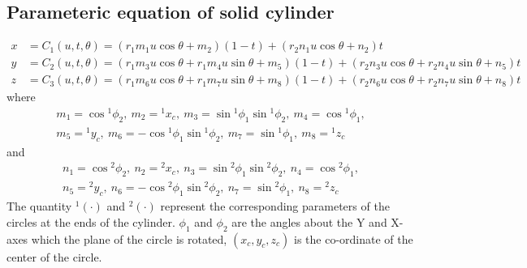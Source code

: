 \documentclass[11pt,a4paper]{article}
\begin{document}
\subsection*{Parameteric equation of solid cylinder}
\begin{align}
x & = C_1(u,t,\theta)=\left(r_1m_1u\cos\theta +m_2 \right)\left(1-t \right)+\left(r_2n_1u\cos\theta+n_2 \right)t\\
y & = C_2(u,t,\theta)=\left(r_1m_3u\cos\theta +r_1m_4u\sin\theta +m_5 \right)\left(1-t \right)+\left(r_2n_3u\cos\theta+r_2n_4u\sin\theta+n_5 \right)t\\
z & = C_3(u,t,\theta)=\left(r_1m_6u\cos\theta +r_1m_7u\sin\theta +m_8 \right)\left(1-t \right)+\left(r_2n_6u\cos\theta+r_2n_7u\sin\theta+n_8 \right)t
\end{align}
where
\begin{align}
m_1 = \cos{}^1\phi_2,~m_2 = {}^1x_c,~m_3 = \sin{}^1\phi_1\sin{}^1\phi_2,~m_4=\cos{}^1\phi_1,\\
m_5 = {}^1y_c,~m_6=-\cos{}^1\phi_1\sin{}^1\phi_2,~m_7=\sin{}^1\phi_1,~m_8={}^1z_c
\end{align}
and
\begin{align}
n_1 = \cos{}^2\phi_2,~n_2 = {}^2x_c,~n_3 = \sin{}^2\phi_1\sin{}^2\phi_2,~n_4=\cos{}^2\phi_1,\\
n_5 = {}^2y_c,~n_6=-\cos{}^2\phi_1\sin{}^2\phi_2,~n_7=\sin{}^2\phi_1,~n_8={}^2z_c
\end{align}
The quantity ${}^1\left(\cdot\right)$ and ${}^2\left(\cdot\right)$ represent the corresponding parameters of the circles at the ends of the cylinder. $\phi_1$ and $\phi_2$ are the angles about the Y and X-axes which the plane of the circle is rotated, $(x_c,y_c,z_c)$ is the co-ordinate of the center of the circle.
%

\begin{thebibliography}{99}

%
%


\end{thebibliography}
\end{document}
